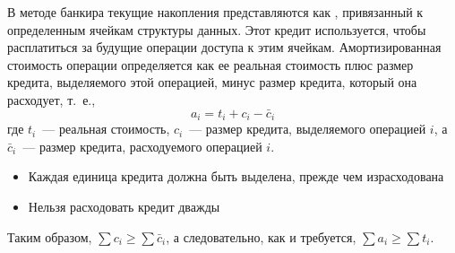 \begin{frame}{}
 В методе банкира
текущие накопления представляются как ,
привязанный к определенным ячейкам структуры данных. Этот кредит
используется, чтобы расплатиться за будущие операции доступа к этим
ячейкам.  Амортизированная стоимость операции определяется как ее
реальная стоимость плюс размер кредита, выделяемого этой операцией,
минус размер кредита, который она расходует, т.~е.,
$$
a_i = t_i + c_i - \bar{c}_i
$$
где $t_i$~--- реальная стоимость, $c_i$~--- размер кредита, выделяемого операцией $i$, а $\bar{c}_i$~---
размер кредита, расходуемого операцией $i$.
%
%
%
\vspace{2em}

\begin{itemize}
\item Каждая единица кредита должна быть выделена, прежде чем  израсходована
\item Нельзя расходовать кредит дважды
\end{itemize}
\vspace{1em}

Таким образом, $\sum c_i \ge \sum \bar{c}_i$, а
следовательно, как и требуется, $\sum a_i \ge \sum t_i$.


\end{frame}

%


